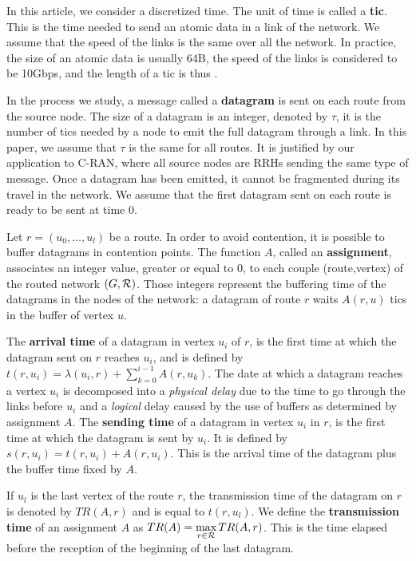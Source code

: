 \documentclass[english]{article}
\begin{document}
 		In this article, we consider a discretized time. The unit of time is called a {\bf tic}. This is the time needed to send an atomic data in a link of the network. We assume that the speed of the links is the same over all the network. In practice, the size of an atomic data is usually 64B, the speed of the links is considered to be 10Gbps, and the length of a tic is thus  .

        In the process we study, a message called a {\bf datagram} is sent on each route from the source node. The size of a datagram is an integer, denoted by $\tau$, it is the number of tics needed by a node to emit the full datagram through a link.  In this paper, we assume that $\tau$ is the same for all routes. It is justified by our application to C-RAN, where all source nodes are RRHs sending the same type of message. Once a datagram has been emitted, it cannot be fragmented during its travel in the network. We assume that the first datagram sent on each route is ready to be sent at time $0$.

          Let $r=(u_0,\dots,u_l)$ be a route. In order to avoid contention, it is possible to buffer datagrams in contention points. The function $A$, called an \textbf{assignment}, associates an integer value, greater or equal to $0$, to each couple (route,vertex) of the routed network $(G,{\cal R})$. Those integers represent the buffering time of the datagrams in the nodes of the network: a datagram of route $r$ waits $A(r,u)$ tics in the buffer of vertex $u$.
          
       

 The \textbf{arrival time} of a datagram in vertex $u_i$ of $r$, is the first time at which the datagram sent on $r$ reaches $u_i$, and is defined by $t(r,u_i) = \lambda(u_i,r) + \sum_{k=0}^{i-1} A(r,u_k) $. The date at which a datagram reaches a vertex $u_i$ is decomposed into a \emph{physical delay} due to the time to go through the links before $u_i$ and a \emph{logical} delay caused by the use of buffers as determined by assignment $A$.
  The \textbf{sending time} of a datagram in vertex $u_i$ in $r$, is the first time at which the datagram is sent by $u_i$. It is defined by $s(r,u_i) = t(r,u_i) +  A(r,u_i) $. This is the arrival time of the datagram plus the buffer time fixed by $A$.
 
  If $u_l$ is the last vertex of the route $r$, the transmission time of the datagram on 
  $r$ is denoted by $TR(A,r)$ and is equal to $t(r,u_l)$. We define the \textbf{transmission time} of an assignment $A$ as $TR(A) = \displaystyle \max\limits_{r \in {\cal R}} TR(A,r) $. This is the time elapsed before the reception of the beginning of the last datagram. 
         
\end{document}
